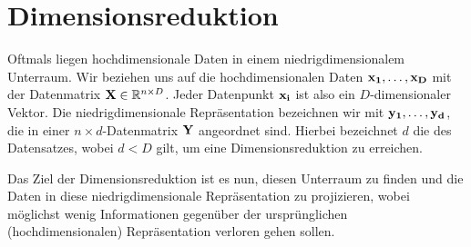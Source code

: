 \chapter{Dimensionsreduktion}
\label{ch:Dimensionsreduktion}


Oftmals liegen hochdimensionale Daten in einem niedrigdimensionalem Unterraum. Wir beziehen uns auf die hochdimensionalen Daten $\mathbf{x_1},\ldots,\mathbf{x_D}$ mit der Datenmatrix $\mathbf{X} \in \mathbb{R}^{n \times D}$. Jeder Datenpunkt $\mathbf{x_i}$ ist also ein $D$-dimensionaler Vektor. Die niedrigdimensionale Repräsentation bezeichnen wir mit $\mathbf{y_1},\ldots,\mathbf{y_d}$, die in einer $n \times d$-Datenmatrix $\mathbf{Y}$ angeordnet sind. Hierbei bezeichnet $d$ die
 des Datensatzes, wobei $d < D$ gilt, um eine Dimensionsreduktion zu erreichen.


Das Ziel der Dimensionsreduktion ist es nun, diesen Unterraum zu finden und die Daten in diese niedrigdimensionale Repräsentation zu projizieren, wobei möglichst wenig Informationen gegenüber der ursprünglichen (hochdimensionalen) Repräsentation verloren gehen sollen.

